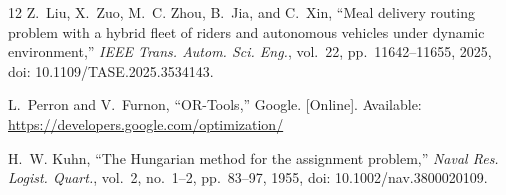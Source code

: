 \documentclass[conference]{IEEEtran}
\begin{document}
\begin{thebibliography}{12}
Z.~Liu, X.~Zuo, M.~C. Zhou, B.~Jia, and C.~Xin, ``Meal delivery routing problem
with a hybrid fleet of riders and autonomous vehicles under dynamic
environment,'' \emph{IEEE Trans. Autom. Sci. Eng.}, vol.~22,
pp.~11642--11655, 2025, doi: 10.1109/TASE.2025.3534143.

L.~Perron and V.~Furnon, ``OR-Tools,'' Google. [Online]. Available:
\url{https://developers.google.com/optimization/}

H.~W. Kuhn, ``The Hungarian method for the assignment problem,'' \emph{Naval
Res. Logist. Quart.}, vol.~2, no.~1--2, pp.~83--97, 1955,
doi: 10.1002/nav.3800020109.

\end{thebibliography}
\end{document}
